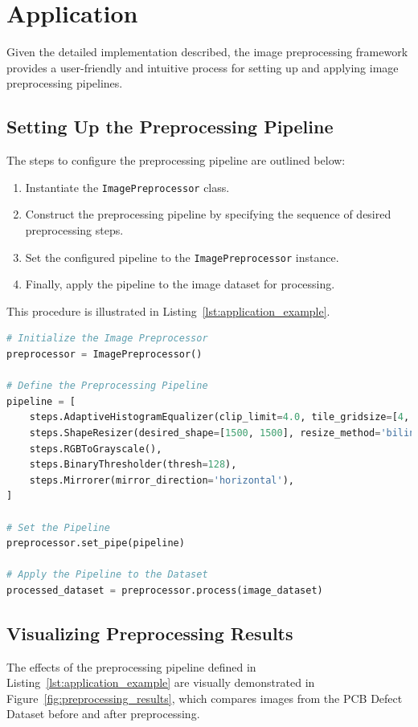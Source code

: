 \documentclass[journal]{new-aiaa}
\begin{document}
\section{Application}
Given the detailed implementation described, the image preprocessing framework provides a user-friendly and intuitive process for setting up and applying image preprocessing pipelines.

\subsection{Setting Up the Preprocessing Pipeline}
The steps to configure the preprocessing pipeline are outlined below:

\begin{enumerate}
	\item Instantiate the \texttt{ImagePreprocessor} class.
	\item Construct the preprocessing pipeline by specifying the sequence of desired preprocessing steps.
	\item Set the configured pipeline to the \texttt{ImagePreprocessor} instance.
	\item Finally, apply the pipeline to the image dataset for processing.
\end{enumerate}

This procedure is illustrated in Listing~\ref{lst:application_example}.

\newpage

\begin{lstlisting}[language=Python, caption=Example of Applying the Image Preprocessing Pipeline, label=lst:application_example]
# Initialize the Image Preprocessor
preprocessor = ImagePreprocessor()

# Define the Preprocessing Pipeline
pipeline = [
    steps.AdaptiveHistogramEqualizer(clip_limit=4.0, tile_gridsize=[4, 4]),
    steps.ShapeResizer(desired_shape=[1500, 1500], resize_method='bilinear'),
    steps.RGBToGrayscale(),
    steps.BinaryThresholder(thresh=128),
    steps.Mirrorer(mirror_direction='horizontal'),
]

# Set the Pipeline 
preprocessor.set_pipe(pipeline)

# Apply the Pipeline to the Dataset
processed_dataset = preprocessor.process(image_dataset)
\end{lstlisting}

\subsection{Visualizing Preprocessing Results}
The effects of the preprocessing pipeline defined in Listing~\ref{lst:application_example} are visually demonstrated in Figure~\ref{fig:preprocessing_results}, which compares images from the PCB Defect Dataset before and after preprocessing.\cite{ding2019tddnet}
\end{document}
